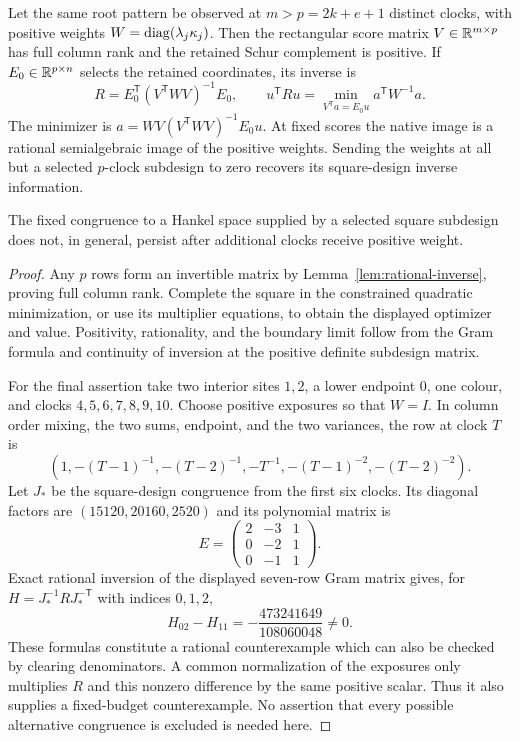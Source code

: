 \begin{proposition}\label{prop:overidentified}
Let the same root pattern be observed at $m>p=2k+e+1$ distinct clocks, with positive weights $W=\operatorname{diag}(\lambda_j\kappa_j)$. Then the rectangular score matrix $V\in\mathbb R^{m\times p}$ has full column rank and the retained Schur complement is positive. If $E_0\in\mathbb R^{p\times n}$ selects the retained coordinates, its inverse is
\[
 R=E_0^{\mathsf T}(V^{\mathsf T}WV)^{-1}E_0,
 \qquad
 u^{\mathsf T}Ru=\min_{V^{\mathsf T}a=E_0u}a^{\mathsf T}W^{-1}a.
\]
The minimizer is $a=WV(V^{\mathsf T}WV)^{-1}E_0u$. At fixed scores the native image is a rational semialgebraic image of the positive weights. Sending the weights at all but a selected $p$-clock subdesign to zero recovers its square-design inverse information.

The fixed congruence to a Hankel space supplied by a selected square subdesign does not, in general, persist after additional clocks receive positive weight.
\end{proposition}
\begin{proof}
Any $p$ rows form an invertible matrix by Lemma~\ref{lem:rational-inverse}, proving full column rank. Complete the square in the constrained quadratic minimization, or use its multiplier equations, to obtain the displayed optimizer and value. Positivity, rationality, and the boundary limit follow from the Gram formula and continuity of inversion at the positive definite subdesign matrix.

For the final assertion take two interior sites $1,2$, a lower endpoint $0$, one colour, and clocks $4,5,6,7,8,9,10$. Choose positive exposures so that $W=I$. In column order mixing, the two sums, endpoint, and the two variances, the row at clock $T$ is
\[
 (1,-(T-1)^{-1},-(T-2)^{-1},-T^{-1},-(T-1)^{-2},-(T-2)^{-2}).
\]
Let $J_*$ be the square-design congruence from the first six clocks. Its diagonal factors are $(15120,20160,2520)$ and its polynomial matrix is
\[
 E=\begin{pmatrix}2&-3&1\\0&-2&1\\0&-1&1\end{pmatrix}.
\]
Exact rational inversion of the displayed seven-row Gram matrix gives, for $H=J_*^{-1}RJ_*^{-\mathsf T}$ with indices $0,1,2$,
\[
 H_{02}-H_{11}=-\frac{473241649}{108060048}\ne0.
\]
These formulas constitute a rational counterexample which can also be checked by clearing denominators. A common normalization of the exposures only multiplies $R$ and this nonzero difference by the same positive scalar. Thus it also supplies a fixed-budget counterexample. No assertion that every possible alternative congruence is excluded is needed here.
\end{proof}
